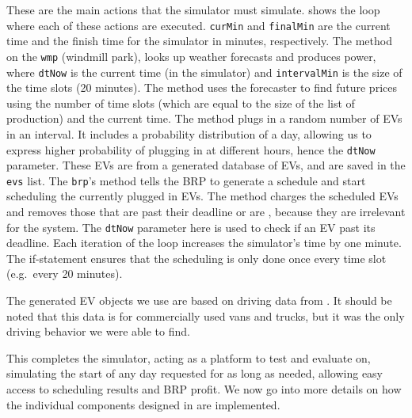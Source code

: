 These are the main actions that the simulator must simulate.  shows the loop where each of these actions are executed. \texttt{curMin} and \texttt{finalMin} are the current time and the finish time for the simulator in minutes, respectively. The  method on the \texttt{wmp} (windmill park), looks up weather forecasts and produces power, where \texttt{dtNow} is the current time (in the simulator) and \texttt{intervalMin} is the size of the time slots (20 minutes). The  method uses the forecaster to find future prices using the number of time slots (which are equal to the size of the list of production) and the current time. The  method plugs in a random number of EVs in an interval. It includes a probability distribution of a day, allowing us to express higher probability of plugging in at different hours, hence the \texttt{dtNow} parameter. These EVs are from a generated database of EVs, and are saved in the \texttt{evs} list. The \texttt{brp}'s  method tells the BRP to generate a schedule and start scheduling the currently plugged in EVs. The  method charges the scheduled EVs and removes those that are past their deadline or are , because they are irrelevant for the system. The \texttt{dtNow} parameter here is used to check if an EV past its deadline. Each iteration of the loop increases the simulator's time by one minute. The if-statement ensures that the scheduling is only done once every time slot (e.g.\ every 20 minutes).

The generated EV objects we use are based on driving data from \cite[p.~52]{TRAFIKSTYRELSEN2010}. It should be noted that this data is for commercially used vans and trucks, but it was the only driving behavior we were able to find. 



This completes the simulator, acting as a platform to test and evaluate on, simulating the start of any day requested for as long as needed, allowing easy access to scheduling results and BRP profit. We now go into more details on how the individual components designed in  are implemented.
